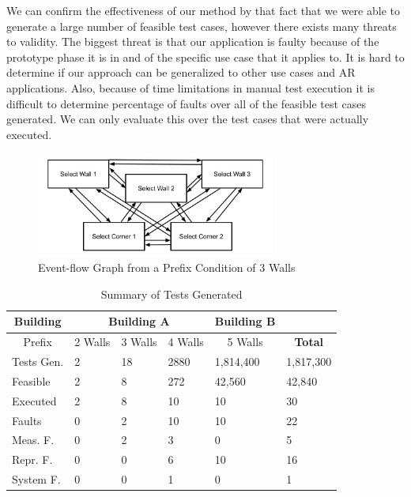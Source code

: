 \documentclass[final,3p]{CSP}
\begin{document}
We can confirm the effectiveness of our method by that fact that we were able to generate a large number of feasible test cases, however there exists many threats to validity.  The biggest threat is that our application is faulty because of the prototype phase it is in and of the specific use case that it applies to.  It is hard to determine if our approach can be generalized to other use cases and AR applications.  Also, because of time limitations in manual test execution it is difficult to determine percentage of faults over all of the feasible test cases generated.  We can only evaluate this over the test cases that were actually executed.

\begin{figure}
    \centering
    \includegraphics[width=0.7\textwidth]{Event-Flow.jpg}
    \caption{Event-flow Graph from a Prefix Condition of 3 Walls}
    \label{fig:evt-flow}
\end{figure}

\begin{table}[]
    \centering
    \begin{tabular}{ |p{2cm}|p{1cm}|p{1cm}|p{1cm}|p{1cm}|p{2cm}| }
     \hline
      \multicolumn{1}{|c|}{Building} &
      \multicolumn{3}{|c|}{Building A} &
      \multicolumn{1}{|c|}{Building B} &
      \multicolumn{1}{|c|}{} \\
     \hline
      \multicolumn{1}{|c|}{Prefix} &
      \multicolumn{1}{|c|}{2 Walls} &
      \multicolumn{1}{|c|}{3 Walls} &
      \multicolumn{1}{|c|}{4 Walls} &
      \multicolumn{1}{|c|}{5 Walls} &
      \multicolumn{1}{|c|}{\textbf{Total}}
      \\
     \hline
     Tests Gen. & 2 & 18 & 2880 & 1,814,400 & 1,817,300 \\
     \hline
     Feasible & 2 & 8 & 272 & 42,560 & 42,840 \\
     \hline
     Executed & 2 & 8 & 10 & 10 & 30 \\
     \hline
     Faults & 0 & 2 & 10 & 10 & 22 \\
     \hline
     \hline
     Meas. F. & 0 & 2 & 3 & 0 & 5 \\
     \hline
     Repr. F. & 0 & 0 & 6 & 10 & 16 \\
     \hline
     System F. & 0 & 0 & 1 & 0 & 1 \\
     \hline
    \end{tabular}
    \caption{Summary of Tests Generated}
    \label{tab:results}
\end{table}
\end{document}
